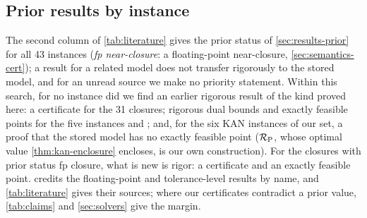 \subsection{Prior results by instance}\label{app:literature-table}

The second column of \cref{tab:literature} gives the prior status of \cref{sec:results-prior} for all 43 instances (\emph{fp near-closure}: a floating-point near-closure, \cref{sec:semantics-cert}); a result for a related model does not transfer rigorously to the stored model, and for an unread source we make no priority statement.
Within this search, for no instance did we find an earlier rigorous result of the kind proved here: a certificate for the 31 closures; rigorous dual bounds and exactly feasible points for the five  instances and ; and, for the six KAN instances of our set, a proof that the stored model has no exactly feasible point ($\mathcal{R}_{\mathrm{P}}$, whose optimal value \cref{thm:kan-enclosure} encloses, is our own construction).
For the closures with prior status fp closure, what is new is rigor: a certificate and an exactly feasible point.
 credits the floating-point and tolerance-level results by name, and \cref{tab:literature} gives their sources; where our certificates contradict a prior value, \cref{tab:claims} and \cref{sec:solvers} give the margin.

